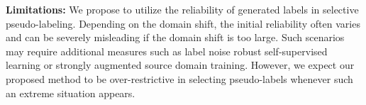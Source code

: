 \documentclass[10pt,twocolumn,letterpaper]{article}
\begin{document}
\vspace{0.6mm}
\noindent \textbf{Limitations:} We propose to utilize the reliability of generated labels in selective pseudo-labeling. Depending on the domain shift, the initial reliability often varies and can be severely misleading if the domain shift is too large. Such scenarios may require additional measures such as label noise robust self-supervised learning or strongly augmented source domain training. However, we expect our proposed method to be over-restrictive in selecting pseudo-labels whenever such an extreme situation appears. 

{\small


}
\end{document}

